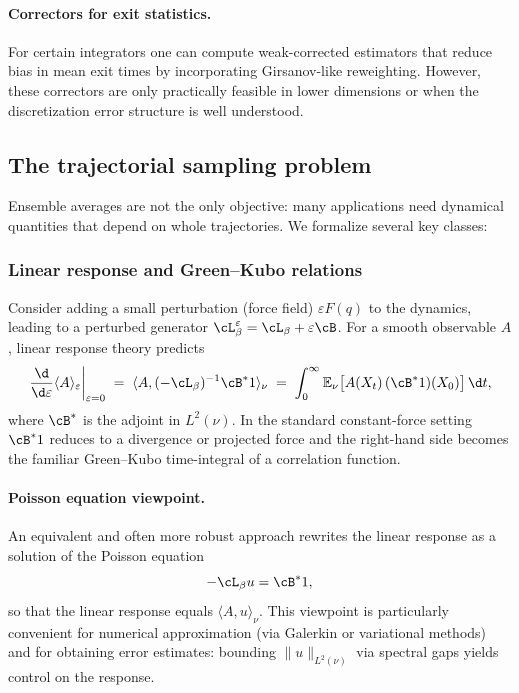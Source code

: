\paragraph{Correctors for exit statistics.} For certain integrators one can compute weak-corrected estimators that reduce bias in mean exit times by incorporating
Girsanov-like reweighting. However, these correctors are only practically feasible in lower dimensions or when the discretization error structure is well understood.

\subsection{The trajectorial sampling problem}
\label{sec:01:dynamical_properties}

Ensemble averages are not the only objective: many applications need dynamical quantities that depend on whole trajectories. We formalize several key classes:

\subsubsection*{Linear response and Green--Kubo relations}
Consider adding a small perturbation (force field) $\varepsilon F(q)$ to the dynamics, leading to a perturbed generator $\cL_\beta^\varepsilon=\cL_\beta+\varepsilon \cB$.
For a smooth observable $A$, linear response theory predicts
\begin{equation}\label{eq:01:linear_response}
    \left.\frac{\d}{\d\varepsilon}\langle A\rangle_\varepsilon\right|_{\varepsilon=0}
    \;=\; \langle A,(-\cL_\beta)^{-1}\cB^\ast 1\rangle_\nu
    \;=\; \int_0^\infty \mathbb E_\nu\big[A(X_t)\,(\cB^\ast 1)(X_0)\big]\,\d t,
\end{equation}
where $\cB^\ast$ is the adjoint in $L^2(\nu)$. In the standard constant-force setting $\cB^\ast 1$ reduces to a divergence or projected force and
the right-hand side becomes the familiar Green--Kubo time-integral of a correlation function.

\paragraph{Poisson equation viewpoint.} An equivalent and often more robust approach rewrites the linear response as a solution of the Poisson equation
\[
-\cL_\beta u = \cB^\ast 1,
\]
so that the linear response equals $\langle A, u \rangle_\nu$. This viewpoint is particularly convenient for numerical approximation (via Galerkin
or variational methods) and for obtaining error estimates: bounding $\|u\|_{L^2(\nu)}$ via spectral gaps yields control on the response.

